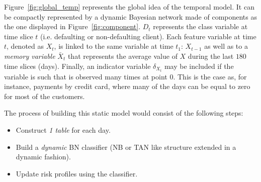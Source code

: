%  
%  
%  
%  
%  

Figure~\ref{fig:global_temp} represents the global idea of the temporal model. It can be compactly
represented by a dynamic Bayesian network made of components as the one displayed in 
Figure~\ref{fig:component}. $D_t$ represents the class variable at time slice $t$ (i.e. defaulting or non-defaulting client). Each feature
variable at time $t$, denoted as $X_t$, is linked to the same variable at time $t_1$: $X_{t-1}$
as well as to a \emph{memory variable} $\bar{X}_t$ that represents the average value of $X$
during the last $180$ time slices (days). Finally, an indicator variable $\delta_{X_t}$ may
be included if the variable is such that is observed many times at point 0. This is the case as,
for instance, payments by credit card, where many of the days can be equal to zero for most of
the customers.


The process of building this static model would consist of the following steps:

\begin{itemize}
\item Construct \emph{1 table} for each day.
\item Build a \emph{dynamic} BN classifier (NB or TAN like structure extended in a dynamic fashion). 
\item Update risk profiles using the classifier.
\end{itemize}





